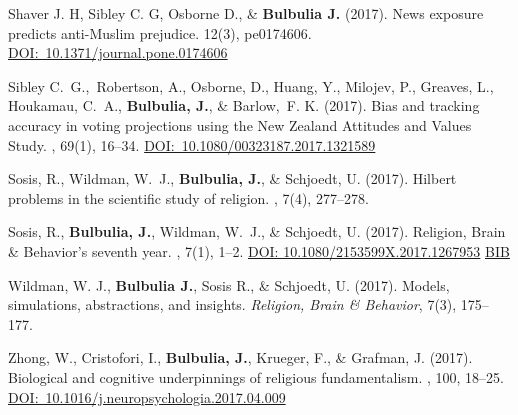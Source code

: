 \documentclass{article}
\begin{document}
\begin{thebibliography}{99}
Shaver J. H, Sibley C. G, Osborne D., \& {\bf Bulbulia J.} (2017).
\newblock  News exposure predicts anti-Muslim prejudice. 
 12(3), pe0174606. 
\href{https://doi.org/10.1371/journal.pone.0174606}{DOI:~10.1371/journal.pone.0174606}



Sibley C.~G.,~Robertson, A., Osborne, D., Huang, Y., Milojev, P., Greaves, L., Houkamau, C.~A., {\bf Bulbulia, J.}, \& Barlow,~F. K. (2017).
\newblock Bias and tracking accuracy in voting projections using the {N}ew
  {Z}ealand {A}ttitudes and {V}alues Study.
, 69(1), 16--34.
 \href{https://doi.org/10.1080/00323187.2017.1321589}{DOI:~10.1080/00323187.2017.1321589}


Sosis, R., Wildman, W.~J., {\bf Bulbulia, J.}, \& Schjoedt, U. (2017).
\newblock Hilbert problems in the scientific study of religion.
, 7(4), 277--278.


Sosis, R., {\bf Bulbulia, J.}, Wildman, W.~J., \& Schjoedt, U. (2017).
\newblock Religion, Brain \& Behavior's seventh year.
, 7(1), 1--2.
\href{https://doi.org/10.1080/2153599X.2017.1267953}{DOI: 10.1080/2153599X.2017.1267953}
\href{https://www.dropbox.com/s/ywxsyerusw7s59w/tandf_rrbb207_1.bib?dl=0}{BIB}


Wildman, W. J., {\bf Bulbulia J.}, Sosis R., \& Schjoedt, U. (2017). 
\newblock  Models, simulations, abstractions, and insights.
{\em Religion, Brain \& Behavior},  7(3),  175--177.


Zhong, W., Cristofori, I., {\bf Bulbulia, J.}, Krueger, F., \& Grafman, J. (2017). 
\newblock Biological and cognitive underpinnings of religious fundamentalism. 
, 100, 18--25.
\href{https://doi.org/10.1016/j.neuropsychologia.2017.04.009}{DOI:~10.1016/j.neuropsychologia.2017.04.009}



\end{thebibliography}
\end{document}

